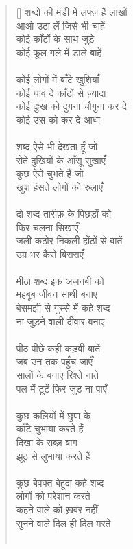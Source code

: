 \begin{verse}[\versewidth]\texthindi{
शब्दों की मंडी में लफ़्ज़ हैं लाखों\\
आओ उठा लें जिसे भी चाहें\\
कोई काँटों के साथ जुड़े\\
कोई फूल गले में डाले बाहें\\
\\
कोई लोगों में बाँटे खुशियाँ\\
कोई घाव दे काँटों से ज़्यादा\\
कोई दुःख को दुगना चौगुना कर दे\\
कोई उस को कर दे आधा\\
\\
शब्द ऐसे भी देखता हूँ जो\\
रोते दुखियों के आँसू सुखाएँ\\
कुछ ऐसे चुभते हैं जो\\
खुश हंसते लोगों को रुलाएँ\\
\\
दो शब्द तारीफ़ के पिछड़ों को\\
फिर चलना सिखाएँ\\
जली कठोर निकली होंठों से बातें\\
उम्र भर कैसे बिसराएँ\\
\\
मीठा शब्द इक अजनबी को\\
महबूब जीवन साथी बनाए\\
बेसमझी से गुस्से में कहे शब्द\\
ना जुड़ने वाली दीवार बनाए\\
\\
पीठ पीछे कही कड़वी बातें\\
जब उन तक पहुँच जाएँ\\
सालों के बनाए रिश्ते नाते\\
पल में टूटें फिर जुड़ ना पाएँ\\
\\
कुछ कलियों में छुपा के\\
काँटे चुभाया करते हैं\\
दिखा के सब्ज़ बाग\\
झूठ से लुभाया करते हैं\\
\\
कुछ बेवक्त बेहूदा कहे शब्द\\
लोगों को परेशान करते\\
कहने वाले को ख़बर नहीं\\
सुनने वाले दिल ही दिल मरते\\
\\
}
\end{verse}
